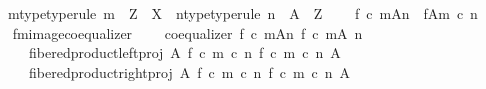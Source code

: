 \begin{isabellebody}
\ \ \ m{\isacharunderscore}{\kern0pt}type{\isacharbrackleft}{\kern0pt}type{\isacharunderscore}{\kern0pt}rule{\isacharbrackright}{\kern0pt}{\isacharcolon}{\kern0pt}\ {\isachardoublequoteopen}m\ {\isacharcolon}{\kern0pt}\ Z\ {\isasymrightarrow}\ X{\isachardoublequoteclose}\ \ n{\isacharunderscore}{\kern0pt}type{\isacharbrackleft}{\kern0pt}type{\isacharunderscore}{\kern0pt}rule{\isacharbrackright}{\kern0pt}{\isacharcolon}{\kern0pt}\ {\isachardoublequoteopen}n\ {\isacharcolon}{\kern0pt}\ A\ {\isasymrightarrow}\ Z{\isachardoublequoteclose}\ \isanewline
\ \ \ {\isachardoublequoteopen}{\isacharparenleft}{\kern0pt}f\ {\isasymcirc}\isactrlsub c\ m{\isacharparenright}{\kern0pt}{\isasymlparr}A{\isasymrparr}\isactrlbsub n\isactrlesub \ {\isasymcong}\ f{\isasymlparr}A{\isasymrparr}\isactrlbsub m\ {\isasymcirc}\isactrlsub c\ n\isactrlesub {\isachardoublequoteclose}\isanewline
%
\isadelimproof
%
\endisadelimproof
%
\isatagproof
{}\isamarkupfalse%
\ {\isacharminus}{\kern0pt}\isanewline
\ \ \isamarkupfalse%
\ f{\isacharunderscore}{\kern0pt}m{\isacharunderscore}{\kern0pt}image{\isacharunderscore}{\kern0pt}coequalizer{\isacharcolon}{\kern0pt}\isanewline
\ \ \ \ {\isachardoublequoteopen}coequalizer\ {\isacharparenleft}{\kern0pt}{\isacharparenleft}{\kern0pt}f\ {\isasymcirc}\isactrlsub c\ m{\isacharparenright}{\kern0pt}{\isasymlparr}A{\isasymrparr}\isactrlbsub n\isactrlesub {\isacharparenright}{\kern0pt}\ {\isacharparenleft}{\kern0pt}{\isacharparenleft}{\kern0pt}f\ {\isasymcirc}\isactrlsub c\ m{\isacharparenright}{\kern0pt}{\isasymrestriction}\isactrlbsub {\isacharparenleft}{\kern0pt}A{\isacharcomma}{\kern0pt}\ n{\isacharparenright}{\kern0pt}\isactrlesub {\isacharparenright}{\kern0pt}\ \isanewline
\ \ \ \ \ \ {\isacharparenleft}{\kern0pt}fibered{\isacharunderscore}{\kern0pt}product{\isacharunderscore}{\kern0pt}left{\isacharunderscore}{\kern0pt}proj\ A\ {\isacharparenleft}{\kern0pt}f\ {\isasymcirc}\isactrlsub c\ m\ {\isasymcirc}\isactrlsub c\ n{\isacharparenright}{\kern0pt}\ {\isacharparenleft}{\kern0pt}f\ {\isasymcirc}\isactrlsub c\ m\ {\isasymcirc}\isactrlsub c\ n{\isacharparenright}{\kern0pt}\ A{\isacharparenright}{\kern0pt}\ \isanewline
\ \ \ \ \ \ {\isacharparenleft}{\kern0pt}fibered{\isacharunderscore}{\kern0pt}product{\isacharunderscore}{\kern0pt}right{\isacharunderscore}{\kern0pt}proj\ A\ {\isacharparenleft}{\kern0pt}f\ {\isasymcirc}\isactrlsub c\ m\ {\isasymcirc}\isactrlsub c\ n{\isacharparenright}{\kern0pt}\ {\isacharparenleft}{\kern0pt}f\ {\isasymcirc}\isactrlsub c\ m\ {\isasymcirc}\isactrlsub c\ n{\isacharparenright}{\kern0pt}\ A{\isacharparenright}{\kern0pt}{\isachardoublequoteclose}\isanewline

\end{isabellebody}
